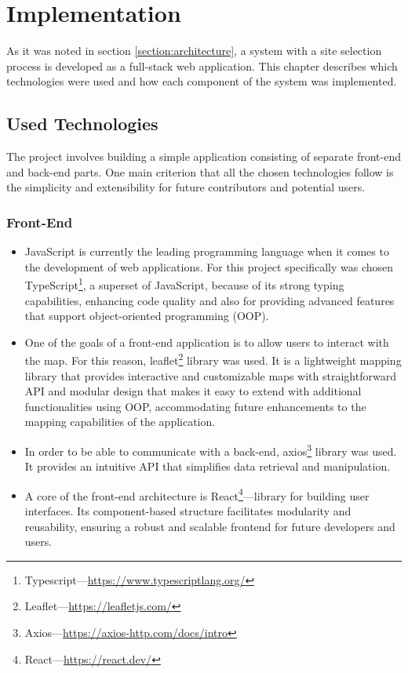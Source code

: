 \chapter{Implementation}
\label{ch:6}

As it was noted in section \ref{section:architecture}, a system with a site selection process is developed as a full-stack web application. This chapter describes which technologies were used and how each component of the system was implemented.

\section{Used Technologies}

The project involves building a simple application consisting of separate front-end and back-end parts. One main criterion that all the chosen technologies follow is the simplicity and extensibility for future contributors and potential users.

\subsection{Front-End}

\begin{itemize}
    \item JavaScript is currently the leading programming language when it comes to the development of web applications. For this project specifically was chosen TypeScript\footnote{Typescript---\url{https://www.typescriptlang.org/}}, a superset of JavaScript, because of its strong typing capabilities, enhancing code quality and also for providing advanced features that support object-oriented programming (OOP). 
    \item One of the goals of a front-end application is to allow users to interact with the map. For this reason, leaflet\footnote{Leaflet---\url{https://leafletjs.com/}} library was used. It is a lightweight mapping library that provides interactive and customizable maps with straightforward API and modular design that makes it easy to extend with additional functionalities using OOP, accommodating future enhancements to the mapping capabilities of the application.
    \item In order to be able to communicate with a back-end, axios\footnote{Axios---\url{https://axios-http.com/docs/intro}} library was used. It provides an intuitive API that simplifies data retrieval and manipulation.
    \item A core of the front-end architecture is React\footnote{React---\url{https://react.dev/}}---library for building user interfaces. Its component-based structure facilitates modularity and reusability, ensuring a robust and scalable frontend for future developers and users.
\end{itemize}

